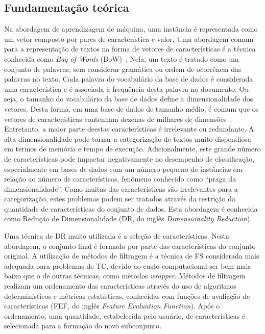 \documentclass[conference]{IEEEtran}
\begin{document}
\subsection{Fundamentação teórica}

Na abordagem de aprendizagem de máquina, uma instância é representada como um vetor composto por pares de característica e valor. Uma abordagem comum para a representação de textos na forma de vetores de características é a técnica conhecida como \emph{Bag of Words} (BoW)~\cite{guyon2003introduction}. Nela, um texto é tratado como um conjunto de palavras, sem considerar gramática ou ordem de ocorrência das palavras no texto. Cada palavra do vocabulário da base de dados é considerada uma característica e é associada à frequência desta palavra no documento. Ou seja, o tamanho do vocabulário da base de dados define a dimensionalidade dos vetores. Desta forma, em uma base de dados de tamanho médio, é comum que os vetores de características contenham dezenas de milhares de dimensões~\cite{gabrilovich2004text}. Entretanto, a maior parte deestas características é irrelevante ou redundante. A alta dimensionalidade pode tornar a categorização de textos muito dispendiosa em termos de memória e tempo de execução. Adicionalmente, este grande número de características pode impactar negativamente no desempenho de classificação, especialmente em bases de dados com um número pequeno de instâncias em relação ao número de características, fenômeno conhecido como ``praga da dimensionalidade''. Como muitas das características são irrelevantes para a categorização, estes problemas podem ser tratados através da restrição da quantidade de características do conjunto de dados. Esta abordagem é conhecida como Redução de Dimensionalidade (DR, do inglês \emph{Dimensionality Reduction}).

Uma técnica de DR muito utilizada é a seleção de características. Nesta abordagem, o conjunto final é formado por parte das características do conjunto original. A utilização de métodos de filtragem é a técnica de FS considerada mais adequada para problemas de TC, devido ao custo computacional ser bem mais baixo que o de outras técnicas, como métodos \emph{wrapper}. Métodos de filtragem realizam um ordenamento das características através do uso de algoritmos determinísticos e métricas estatísticas, conhecidas com funções de avaliação de características (FEF, do inglês \emph{Feature Evaluation Function}). Após o ordenamento, uma quantidade, estabelecida pelo usuário, de características é selecionada para a formação do novo subconjunto.
\end{document}
